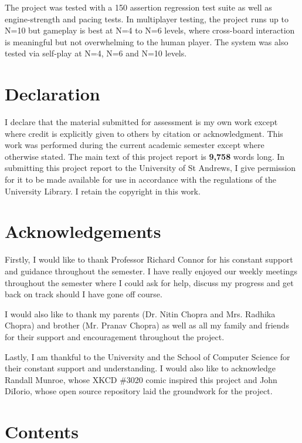 \documentclass[11pt,a4paper]{article}
\begin{document}
The project was tested with a 150 assertion regression test suite as well as engine-strength and pacing tests. In multiplayer testing, the project runs up to N=10 but gameplay is best at N=4 to N=6 levels, where cross-board interaction is meaningful but not overwhelming to the human player. The system was also tested via self-play at N=4, N=6 and N=10 levels.

\newpage
\section*{Declaration}
I declare that the material submitted for assessment is my own work except where credit is explicitly given to others by citation or acknowledgment. This work was performed during the current academic semester except where otherwise stated. The main text of this project report is \textbf{9,758} words long.
In submitting this project report to the University of St Andrews, I give permission
for it to be made available for use in accordance with the regulations of the University Library. I retain the copyright in this work.

\newpage
\section*{Acknowledgements}

Firstly, I would like to thank Professor Richard Connor for his constant support and guidance throughout the semester. I have really enjoyed our weekly meetings throughout the semester where I could ask for help, discuss my progress and get back on track should I have gone off course. 

I would also like to thank my parents (Dr. Nitin Chopra and Mrs. Radhika Chopra) and brother (Mr. Pranav Chopra) as well as all my family and friends for their support and encouragement throughout the project. 

Lastly, I am thankful to the University and the School of Computer Science for their constant support and understanding. I would also like to acknowledge Randall Munroe, whose XKCD \#3020 comic inspired this project and John DiIorio, whose open source repository laid the groundwork for the project.

\newpage
\section*{Contents}
\renewcommand{\contentsname}{}
\tableofcontents
\newpage
\end{document}
